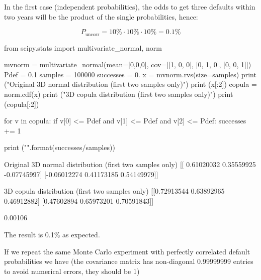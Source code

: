 In the first case (independent probabilities), the odds to get three defaults within two years will be the product of the single probabilities, hence:

\[P_{\mathrm{uncorr}} = 10\% \cdot 10\% \cdot 10\% = 0.1 \%\]

\begin{ipython}
from scipy.stats import multivariate_normal, norm

mvnorm = multivariate_normal(mean=[0,0,0], cov=[[1, 0, 0],
                                                [0, 1, 0],
                                                [0, 0, 1]])
Pdef = 0.1
samples = 100000
successes = 0.
x = mvnorm.rvs(size=samples)
print ("Original 3D normal distribution (first two samples only)")
print (x[:2])
copula = norm.cdf(x)
print ("\n3D copula distribution (first two samples only)")
print (copula[:2])

for v in copula:
  if v[0] <= Pdef and v[1] <= Pdef and v[2] <= Pdef:
    successes += 1
        
print ("\n{}".format(successes/samples))
\end{ipython}
\begin{ioutput}
Original 3D normal distribution (first two samples only)
[[ 0.61020032  0.35559925 -0.07745997]
 [-0.06012274  0.41173185  0.54149979]]

3D copula distribution (first two samples only)
[[0.72913544 0.63892965 0.46912882]
 [0.47602894 0.65973201 0.70591843]]

0.00106
\end{ioutput}
\noindent
The result is 0.1\% as expected.

If we repeat the same Monte Carlo experiment with perfectly correlated default probabilities we have (the covariance matrix has non-diagonal 0.99999999 entries to avoid numerical errors, they should be 1)

